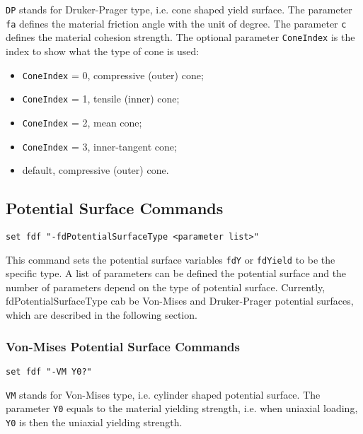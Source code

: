 \texttt{DP} stands for Druker-Prager type, i.e. cone shaped yield surface. 
The parameter \texttt{fa} defines the material friction angle with the unit of degree. 
The parameter \texttt{c} defines the material cohesion strength. 
The optional parameter \texttt{ConeIndex} is the index to show what the type of cone is used:
\begin{itemize}
  \item \texttt{ConeIndex} = 0, compressive (outer) cone;
  \item \texttt{ConeIndex} = 1, tensile (inner) cone;
  \item \texttt{ConeIndex} = 2, mean cone;
  \item \texttt{ConeIndex} = 3, inner-tangent cone;
  \item default, compressive (outer) cone.
\end{itemize}  

\subsection{Potential Surface Commands}
\label{fdps}

\begin{verbatim}
set fdf "-fdPotentialSurfaceType <parameter list>" 
\end{verbatim}

This command sets the potential surface variables \texttt{fdY} or \texttt{fdYield} to be the
specific type. A list of parameters can be defined the potential surface and the number of 
parameters depend on the type of potential surface. Currently, fdPotentialSurfaceType cab be 
Von-Mises and Druker-Prager potential surfaces, which are described in the following section.


\subsubsection{Von-Mises Potential Surface Commands}
\label{fdVMps}

\begin{verbatim}
set fdf "-VM Y0?" 
\end{verbatim}

\texttt{VM} stands for Von-Mises type, i.e. cylinder shaped potential surface. The parameter \texttt{Y0} 
equals to the material yielding strength, i.e. when uniaxial loading, \texttt{Y0} is then the 
uniaxial yielding strength.   
 
